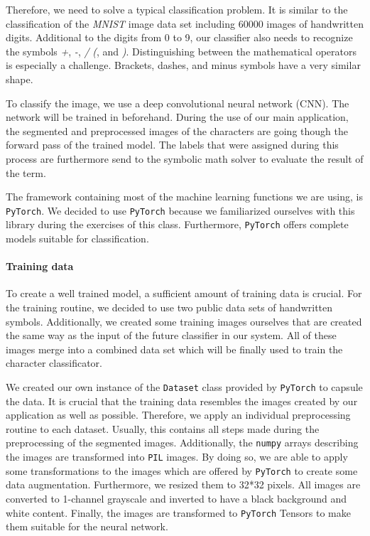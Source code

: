 \documentclass[12pt]{article}
\begin{document}
	Therefore, we need to solve a typical classification problem. It is similar to the classification of the \textit{MNIST} image data set including 60000 images of handwritten digits. Additional to the digits from 0 to 9, our classifier also needs to recognize the symbols \textit{+}, \textit{-}, \textit{/} \textit{(}, and \textit{)}. Distinguishing between the mathematical operators is especially a challenge. Brackets, dashes, and minus symbols have a very similar shape.
	
	To classify the image, we use a deep convolutional neural network (CNN). The network will be trained in beforehand. During the use of our main application, the segmented and preprocessed images of the characters are going though the forward pass of the trained model. The labels that were assigned during this process are furthermore send to the symbolic math solver to evaluate the result of the term. 
	
	The framework containing most of the machine learning functions we are using, is \texttt{PyTorch}. We decided to use \texttt{PyTorch} because we familiarized ourselves with this library during the exercises of this class. Furthermore, \texttt{PyTorch} offers complete models suitable for classification.
		
	
	\paragraph{Training data}
		To create a well trained model, a sufficient amount of training data is crucial. For the training routine, we decided to use two public data sets of handwritten symbols. Additionally, we created some training images ourselves that are created the same way as the input of the future classifier in our system. All of these images merge into a combined data set which will be finally used to train the character classificator.
		
		We created our own instance of the \texttt{Dataset} class provided by \texttt{PyTorch} to capsule the data. It is crucial that the training data resembles the images created by our application as well as possible. Therefore, we apply an individual preprocessing routine to each dataset. Usually, this contains all steps made during the preprocessing of the segmented images. Additionally, the \texttt{numpy} arrays describing the images are transformed into \texttt{PIL} images. By doing so, we are able to apply some transformations to the images which are offered by \texttt{PyTorch} to create some data augmentation. Furthermore, we resized them to 32*32 pixels. All images are converted to 1-channel grayscale and inverted to have a black background and white content. Finally, the images are transformed to \texttt{PyTorch} Tensors to make them suitable for the neural network. 
		
\end{document}
